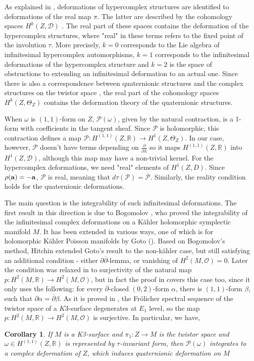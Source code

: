 \documentclass[11pt,oneside,leqno]{amsart}
\theoremstyle{plain}
\newtheorem{cor}[theorem]{Corollary}
\theoremstyle{definition}
\begin{document}
  As explained in \cite{PP2}, deformations of hypercomplex structures
  are identified to deformations of the real map $\pi$.
  The latter are described by the cohomology spaces
  $H^k(Z, \mathcal{D})$  \cite{Hor}. The real part of these spaces contains the deformation
  of the hypercomplex structures, where "real" in these terms refers to the fixed point of the involution $\tau$. More precisely, $k=0$ corresponds to the Lie algebra of infinitesimal hypercomplex automorphisms, $k=1$ corresponds to the infinitesimal deformations of the hypercomplex structure and $k=2$ is the space of obstructions to extending an infinitesimal deformation to an actual one. Since there is also a correspondence
  between quaternionic structures and the complex structures on the twistor space
  \cite{Salamon}, the real part of the cohomology spaces $H^k(Z, \Theta_Z)$
  contains the deformation theory of the quaternionic structures.

When $\omega$ is $(1,1)$-form on $Z$, $\mathcal{P}(\omega)$, given by the natural contraction, is a 1-form with coefficients in the tangent sheaf. Since $\mathcal{P}$ is holomorphic, this contraction defines a map $\mathcal{P}: H^{(1,1)}(Z,\mathbb{R})\rightarrow H^1(Z,\Theta_Z)$.
In our case, however, $\mathcal{P}$ doesn't have terms depending on $\frac{\partial}{\partial\lambda}$ so it maps $H^{(1,1)}(Z,\mathbb{R})$ into $H^1(Z,\mathcal{D})$, although this map may have a non-trivial kernel.
For the hypercomplex deformations, we need "real" elements of $H^1(Z,D)$. Since $\rho({\bf a})=-{\bf a}$,  $\mathcal{P}$ is real, meaning that $d\tau(\mathcal{P}) = \overline{\mathcal{P}}$. Similarly, the reality condition holds for the quaternionic deformations.

The main question is the integrability of such infinitesimal deformations. The first result in this direction is due to
Bogomolov \cite{Bog}, who proved the integrability of the infinitesimal complex deformations on a K\"ahler holomorphic symplectic manifold $M$. It has been extended in various ways, one of which is for holomorphic K\"ahler Poisson manifolds by Goto (\cite{Goto}). Based on Bogomolov's method, Hitchin \cite{Hitchin} extended Goto's result to the non-k\"ahler case, but still satisfying an additional condition - either $\partial\overline{\partial}$-lemma, or vanishing of $H^2(M,\mathcal{O})=0$. Later the condition was relaxed in \cite{FM} to surjectivity of the natural map $p: H^2(M,\mathbb{R}) \to H^2(M,\mathcal{O})$, but in fact the proof in \cite{Hitchin} covers this case too, since it only uses the following: for every $\overline{\partial}$-closed $(0,2)$-form $\alpha$, there is $(1,1)$-form $\beta$, such that $\partial\alpha = \overline{\partial}\beta$.
As it is proved in \cite{ES}, the Fr\"{o}licher spectral sequence of the twistor space of a $K3$-surface degenerates at $E_1$ level, so the map $p: H^2(M,\mathbb{R}) \to H^2(M,\mathcal{O})$ is surjective. In particular, we have,
\begin{cor}
If $M$ is a K3-surface and $\pi_1:Z\to M$ is the twistor space and $\omega\in H^{(1,1)}(Z,\mathbb{R})$ is represented by $\tau$-invariant form, then $\mathcal{P}(\omega)$ integrates to a complex deformation of $Z$, which induces quaternionic deformation on $M$
\end{cor}
\end{document}
